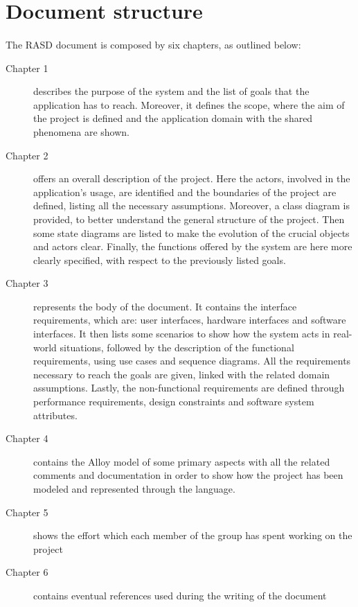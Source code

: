 		\section{Document structure}
			\paragraph{}
				The RASD document is composed by six chapters, as outlined below:
			\begin{description}
				\item[Chapter 1] describes the purpose of the system and the list of goals that the application has to reach. Moreover, it defines the scope, where the aim of the project is defined and the application domain with the shared phenomena are shown.
				\item[Chapter 2] offers an overall description of the project. Here the actors, involved in the application's usage, are identified and the boundaries of the project are defined, listing all the necessary assumptions. Moreover, a class diagram is provided, to better understand the general structure of the project. Then some state diagrams are listed to make the evolution of the crucial objects and actors clear. Finally, the functions offered by the system are here more clearly specified, with respect to the previously listed goals.
				\item[Chapter 3] represents the body of the document. It contains the interface requirements, which are: user interfaces, hardware interfaces and software interfaces. It then lists some scenarios to show how the system acts in real-world situations, followed by the description of the functional requirements, using use cases and sequence diagrams. All the requirements necessary to reach the goals are given, linked with the related domain assumptions. Lastly, the non-functional requirements are defined through performance requirements, design constraints and software system attributes.
				\item[Chapter 4] contains the Alloy model of some primary aspects with all the related comments and documentation in order to show how the project has been modeled and represented through the language.
				\item[Chapter 5] shows the effort which each member of the group has spent working on the project
				\item[Chapter 6] contains eventual references used during the writing of the document
			\end{description}